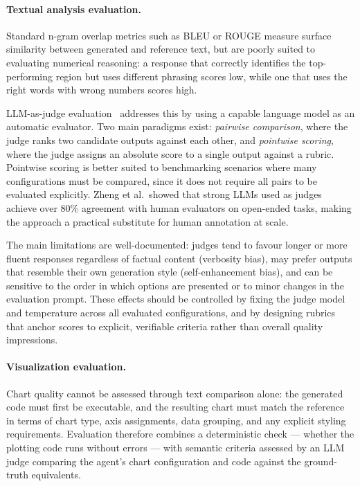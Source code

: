 \paragraph{Textual analysis evaluation.}
Standard n-gram overlap metrics such as BLEU or ROUGE measure surface similarity
between generated and reference text, but are poorly suited to evaluating
numerical reasoning: a response that correctly identifies the top-performing
region but uses different phrasing scores low, while one that uses the right
words with wrong numbers scores high.

LLM-as-judge evaluation~\cite{zheng2023judging} addresses this by using a
capable language model as an automatic evaluator.
Two main paradigms exist: \textit{pairwise comparison}, where the judge ranks
two candidate outputs against each other, and \textit{pointwise scoring}, where
the judge assigns an absolute score to a single output against a rubric.
Pointwise scoring is better suited to benchmarking scenarios where many
configurations must be compared, since it does not require all pairs to be
evaluated explicitly.
Zheng et al.\ showed that strong LLMs used as judges achieve over 80\% agreement
with human evaluators on open-ended tasks, making the approach a practical
substitute for human annotation at scale.

The main limitations are well-documented: judges tend to favour longer or more
fluent responses regardless of factual content (verbosity bias), may prefer
outputs that resemble their own generation style (self-enhancement bias), and
can be sensitive to the order in which options are presented or to minor changes
in the evaluation prompt.
These effects should be controlled by fixing the judge model and temperature
across all evaluated configurations, and by designing rubrics that anchor scores
to explicit, verifiable criteria rather than overall quality impressions.

\paragraph{Visualization evaluation.}
Chart quality cannot be assessed through text comparison alone: the generated
code must first be executable, and the resulting chart must match the reference
in terms of chart type, axis assignments, data grouping, and any explicit
styling requirements.
Evaluation therefore combines a deterministic check --- whether the plotting
code runs without errors --- with semantic criteria assessed by an LLM judge
comparing the agent's chart configuration and code against the ground-truth
equivalents.

